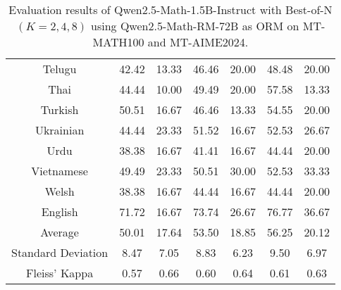 \begin{table*}[]
\begin{tabular}{c|cc|cc|cc}
Telugu & 42.42 & 13.33 & 46.46 & 20.00 & 48.48 & 20.00 \\
Thai & 44.44 & 10.00 & 49.49 & 20.00 & 57.58 & 13.33 \\
Turkish & 50.51 & 16.67 & 46.46 & 13.33 & 54.55 & 20.00 \\
Ukrainian & 44.44 & 23.33 & 51.52 & 16.67 & 52.53 & 26.67 \\
Urdu & 38.38 & 16.67 & 41.41 & 16.67 & 44.44 & 20.00 \\
Vietnamese & 49.49 & 23.33 & 50.51 & 30.00 & 52.53 & 33.33 \\
Welsh & 38.38 & 16.67 & 44.44 & 16.67 & 44.44 & 20.00 \\
\rowcolor[HTML]{FCE5CD} 
English & 71.72 & 16.67 & 73.74 & 26.67 & 76.77 & 36.67 \\ \midrule
Average & 50.01 & 17.64 & 53.50 & 18.85 & 56.25 & 20.12 \\
Standard Deviation & 8.47 & 7.05 & 8.83 & 6.23 & 9.50 & 6.97 \\
Fleiss' Kappa & 0.57 & 0.66 & 0.60 & 0.64 & 0.61 & 0.63 \\ \bottomrule
\end{tabular}
\caption{\footnotesize Evaluation results of Qwen2.5-Math-1.5B-Instruct with Best-of-N \((K=2, 4, 8)\) using Qwen2.5-Math-RM-72B as ORM on MT-MATH100 and MT-AIME2024.}
\label{tab:1_5B_orm}
\end{table*}

